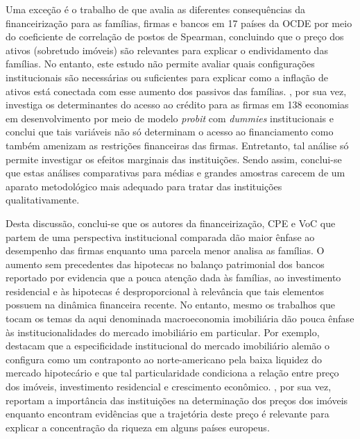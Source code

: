 Uma exceção é o trabalho de \textcite{karwowski_financialisation_2019} que avalia as diferentes consequências da financeirização para as famílias, firmas e bancos em 17 países da OCDE por meio do coeficiente de correlação de postos de Spearman, concluindo que o preço dos ativos (sobretudo imóveis) são relevantes para explicar o endividamento das famílias.
No entanto, este estudo não permite avaliar quais configurações institucionais são necessárias ou suficientes para explicar como a inflação de ativos está conectada com esse aumento dos passivos das famílias.
\textcite{mertzanis_financialisation_2019}, por sua vez, investiga os determinantes do acesso ao crédito para as firmas em 138 economias em desenvolvimento por meio de modelo \textit{probit} com \textit{dummies} institucionais e conclui que tais variáveis não só determinam o acesso ao financiamento como também amenizam as restrições financeiras das firmas.
Entretanto,  tal análise só permite investigar os efeitos marginais das instituições.
Sendo assim, conclui-se que estas análises comparativas para médias e grandes amostras carecem de um aparato metodológico mais adequado para tratar das instituições qualitativamente.


Desta discussão, conclui-se que os autores da financeirização, CPE e VoC que partem de uma perspectiva institucional comparada dão maior ênfase ao desempenho das firmas enquanto uma parcela menor analisa as famílias.
O aumento sem precedentes das hipotecas no balanço patrimonial dos bancos reportado por \textcite{jorda_great_2016} evidencia  que a pouca atenção dada às famílias, ao investimento residencial e às hipotecas é desproporcional à relevância que tais elementos possuem na dinâmica financeira recente. 
No entanto, mesmo os trabalhos que tocam os temas da aqui denominada macroeconomia imobiliária dão pouca ênfase às institucionalidades do mercado imobiliário em particular.
Por exemplo, \textcite{wijburg_alternative_2017} destacam que a especificidade institucional do mercado imobiliário alemão o configura como um contraponto ao norte-americano pela baixa liquidez do mercado hipotecário e que tal particularidade condiciona a relação entre preço dos imóveis, investimento residencial e crescimento econômico. %
\textcite{johnston_global_2017}, por sua vez, reportam a importância das instituições na determinação dos preços dos imóveis enquanto \textcite{fuller_housing_2020} encontram evidências que a trajetória deste preço é relevante para explicar a concentração da riqueza em alguns países europeus.


